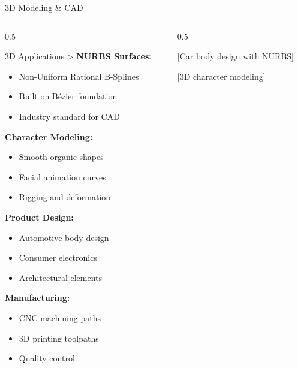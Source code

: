 \begin{frame}{3D Modeling \& CAD}
  \begin{columns}
    \begin{column}{0.5\textwidth}
      \begin{conceptbox}{3D Applications}
        \footnotesize>
        \textbf{NURBS Surfaces:}
        \begin{itemize}
          \item Non-Uniform Rational B-Splines
          \item Built on Bézier foundation
          \item Industry standard for CAD
        \end{itemize}

        \textbf{Character Modeling:}
        \begin{itemize}
          \item Smooth organic shapes
          \item Facial animation curves
          \item Rigging and deformation
        \end{itemize}

        \textbf{Product Design:}
        \begin{itemize}
          \item Automotive body design
          \item Consumer electronics
          \item Architectural elements
        \end{itemize}

        \textbf{Manufacturing:}
        \begin{itemize}
          \item CNC machining paths
          \item 3D printing toolpaths
          \item Quality control
        \end{itemize}
      \end{conceptbox}
    \end{column}
    \begin{column}{0.5\textwidth}
      \begin{center}
        \textcolor{AccentColor}{[Car body design with NURBS]}

        \vspace{0.5cm}

        \textcolor{AccentColor}{[3D character modeling]}

        \vspace{0.5cm}


\end{center}
\end{column}
\end{columns}
\end{frame}
